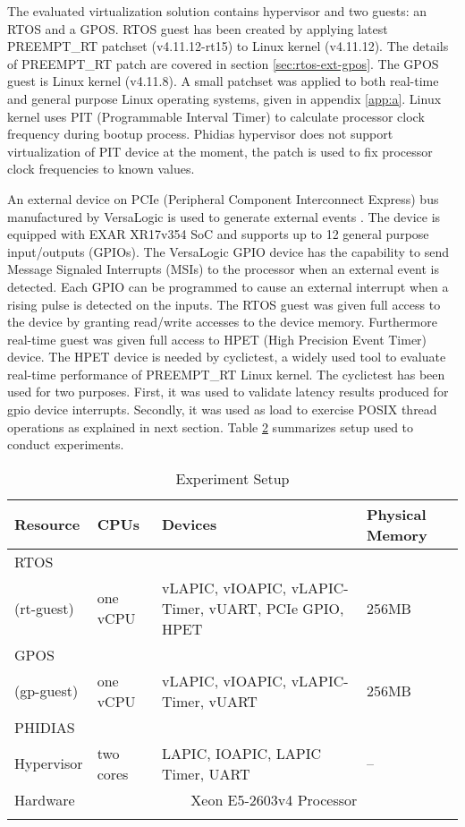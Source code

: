 The evaluated virtualization solution contains hypervisor and two guests: an RTOS and a GPOS.
RTOS guest has been created by applying latest PREEMPT\_RT patchset (v4.11.12-rt15) to Linux kernel (v4.11.12).
The details of PREEMPT\_RT patch are covered in section \ref{sec:rtos-ext-gpos}.
The GPOS guest is Linux kernel (v4.11.8).
A small patchset was applied to both real-time and general purpose Linux operating systems, given in appendix \ref{app:a}.
Linux kernel uses PIT (Programmable Interval Timer) to calculate processor clock frequency during bootup process.
Phidias hypervisor does not support virtualization of PIT device at the moment, the patch is used to fix processor clock frequencies to known values.


An external device on PCIe (Peripheral Component Interconnect Express) bus manufactured by VersaLogic is used to generate external events \cite{versalogic}.
The device is equipped with EXAR XR17v354 SoC \cite{xr17v354} and supports up to 12 general purpose input/outputs (GPIOs). 
The VersaLogic GPIO device has the capability to send Message Signaled Interrupts (MSIs) to the processor when an external event is detected.
Each GPIO can be programmed to cause an external interrupt when a rising pulse is detected on the inputs.
The RTOS guest was given full access to the device by granting read/write accesses to the device memory.
Furthermore real-time guest was given full access to HPET (High Precision Event Timer) device. 
The HPET device is needed by cyclictest\cite{cyclictest}, a widely used tool to evaluate real-time performance of PREEMPT\_RT Linux kernel.
The cyclictest has been used for two purposes. First, it was used to validate latency results produced for gpio device interrupts.
Secondly, it was used as load to exercise POSIX thread operations as explained in next section.
Table \ref{experiment-setup} summarizes setup used to conduct experiments.


\begin{table}[!htbp]
\centering
\begin{longtable}{|p{2cm}|p{2cm}|p{6cm}|p{2cm}|}  
\hline
\textbf{Resource} & \textbf{CPUs} & \textbf{Devices} & \textbf{Physical Memory} \\ \hline 
RTOS & & & \\ 
(rt-guest) & one vCPU & vLAPIC, vIOAPIC, vLAPIC-Timer, vUART, PCIe GPIO, HPET & 256MB \\ \hline
GPOS & & & \\ 
(gp-guest) & one vCPU & vLAPIC, vIOAPIC, vLAPIC-Timer, vUART & 256MB \\ \hline
PHIDIAS & & & \\ 
Hypervisor & two cores & LAPIC, IOAPIC, LAPIC Timer, UART & -- \\ \hline
Hardware & \multicolumn{3}{|c|}{Xeon  E5-2603v4 Processor} \\ \hline
\caption{Experiment Setup}
\label{experiment-setup}
\end{longtable}
\end{table}

